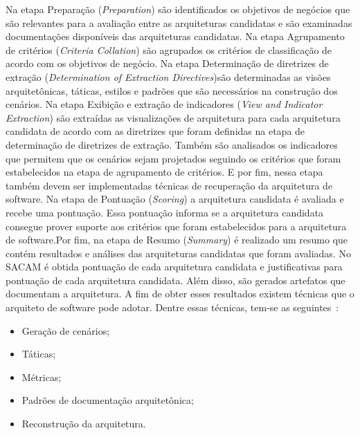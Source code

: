 Na etapa Preparação (\emph{Preparation}) são identificados os objetivos de negócios que são relevantes para a avaliação entre as arquiteturas candidatas e são examinadas documentações disponíveis das arquiteturas candidatas. Na etapa Agrupamento de critérios (\emph{Criteria Collation}) são agrupados os critérios de classificação de acordo com os objetivos de negócio. Na etapa Determinação de diretrizes de extração (\emph{Determination of Extraction Directives})são determinadas as visões arquitetônicas, táticas, estilos e padrões que são necessários na construção dos cenários. Na etapa Exibição e extração de indicadores (\emph{View and Indicator Extraction}) são extraídas as visualizações de arquitetura para cada arquitetura candidata de acordo com as diretrizes que foram definidas na etapa de determinação de diretrizes de extração. Também são analisados os indicadores que permitem que os cenários sejam projetados seguindo os critérios que foram estabelecidos na etapa de agrupamento de critérios. E por fim, nessa etapa também devem ser implementadas técnicas de recuperação da arquitetura de software. Na etapa de Pontuação (\emph{Scoring}) a arquitetura candidata é avaliada e recebe uma pontuação. Essa pontuação informa se a arquitetura candidata consegue prover suporte aos critérios que foram estabelecidos para a arquitetura de software.Por fim, na etapa de Resumo (\emph{Summary}) é realizado um resumo que contém resultados e análises das arquiteturas candidatas que foram avaliadas.
No SACAM é obtida  pontuação de cada arquitetura candidata e justificativas para pontuação de cada arquitetura candidata. Além disso, são gerados artefatos que documentam a arquitetura. A fim de obter esses resultados existem técnicas que o arquiteto de software pode adotar. Dentre essas técnicas, tem-se as seguintes~\cite{SACAM}:

\begin{itemize}
    \item Geração de cenários;
    \item Táticas;
    \item Métricas;
    \item Padrões de documentação arquitetônica;
    \item Reconstrução da arquitetura.
\end{itemize}

